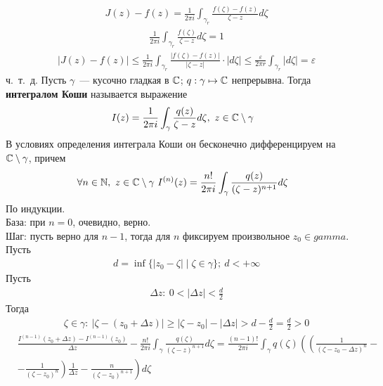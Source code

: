 \begin{align*}
  & J(z) - f(z) = \frac{1}{2 \pi i} \int_{\gamma_r} \frac{f(\zeta) - f(z)}{\zeta - z} d \zeta
\end{align*}
\begin{align*}
  & \frac{1}{2 \pi i} \int_{\gamma_r} \frac{f(\zeta)}{\zeta - z} d \zeta = 1
\end{align*}
\begin{align*}
  & \left| J(z) - f(z) \right| \leq \frac{1}{2 \pi i} \int_{\gamma_r} \frac{\left| f(\zeta) - f(z) \right|}{\left| \zeta - z \right|} \cdot \left| d\zeta \right| \leq \frac{\varepsilon}{2 \pi r} \int_{\gamma_r}\left| d\zeta \right| = \varepsilon
\end{align*}
ч.~т.~д.
\Def
Пусть $\gamma$~--- кусочно гладкая в $\mathbb{C}$; $q: \gamma \mapsto \mathbb{C}$ непрерывна.
Тогда \textbf{интегралом Коши} называется выражение
\begin{equation} \label{(8.2)}
    I(z) = \frac{1}{2 \pi i} \int_{\gamma} \frac{q(z)}{\zeta - z} d\zeta, \ z \in \mathbb{C} \setminus \gamma
\end{equation}
\theorem
В условиях определения интеграла Коши он бесконечно дифференцируем на
$\mathbb{C}\setminus\gamma$, причем
\begin{equation} \label{(8.3)}
    \forall n \in \mathbb{N}, \  z \in \mathbb{C} \setminus \gamma \ I^{(n)}(z) = \frac{n!}{2 \pi i} \int_{\gamma} \frac{q(z)}{(\zeta - z)^{n+1}} d\zeta
\end{equation}
\pr
По индукции.
\\
База: при $n=0$, очевидно, верно.
\\
Шаг: пусть верно для $n-1$, тогда для $n$ фиксируем произвольное $z_0 \in
gamma$.
\\
Пусть
\begin{align*}
  & d = \inf\{\left| z_0 - \zeta \right| \mid \zeta \in \gamma\}; \ d < +\infty
\end{align*}
Пусть
\begin{align*}
  & \Delta z: \ 0 < \left| \Delta z \right| < \frac{d}{2}
\end{align*}
Тогда
\begin{align*}
  & \zeta \in \gamma: \ \left| \zeta - (z_0+\Delta z)\right| \geq \left| \zeta - z_0 \right| - \left| \Delta z \right| > d - \frac{d}{2} = \frac{d}{2} > 0
\end{align*}
\begin{align*}
  & \frac{I^{(n-1)}(z_0+\Delta z) - I^{(n-1)}(z_0)}{\Delta z} - \frac{n!}{2 \pi i}\int_{\gamma}\frac{q(\zeta)}{(\zeta-z)^{n+1}}d\zeta = \frac{(n-1)!}{2 \pi i}\int_{\gamma}q(\zeta)\left( \left( \frac{1}{(\zeta-z_0-\Delta z)^n} - \right. \right.\\
  & \left. \left. - \frac{1}{(\zeta-z_0)^n} \right)\frac{1}{\Delta z} - \frac{n}{(\zeta-z_0)^{n+1}}\right)d\zeta
\end{align*}
